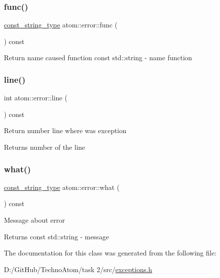 \subsubsection{\texorpdfstring{func()}{func()}}
{\footnotesize\ttfamily \hyperlink{classatom_1_1error_ac330e9fb7cedcf4a173c5eb156d7bdaf}{const\+\_\+string\+\_\+type} atom\+::error\+::func (\begin{DoxyParamCaption}{ }\end{DoxyParamCaption}) const\hspace{0.3cm}{\ttfamily [inline]}}

Return name caused function  const std\+::string -\/ name function \mbox{\label{classatom_1_1error_aa9443d1a458d0dc6086372444a58e8c6}} 
\subsubsection{\texorpdfstring{line()}{line()}}
{\footnotesize\ttfamily int atom\+::error\+::line (\begin{DoxyParamCaption}{ }\end{DoxyParamCaption}) const\hspace{0.3cm}{\ttfamily [inline]}}

Return number line where was exception \begin{DoxyReturn}{Returns}
number of the line 
\end{DoxyReturn}
\mbox{\label{classatom_1_1error_a126f6c573e37febac3148244389f7736}} 
\subsubsection{\texorpdfstring{what()}{what()}}
{\footnotesize\ttfamily \hyperlink{classatom_1_1error_ac330e9fb7cedcf4a173c5eb156d7bdaf}{const\+\_\+string\+\_\+type} atom\+::error\+::what (\begin{DoxyParamCaption}{ }\end{DoxyParamCaption}) const\hspace{0.3cm}{\ttfamily [inline]}}

Message about error \begin{DoxyReturn}{Returns}
const std\+::string -\/ message 
\end{DoxyReturn}


The documentation for this class was generated from the following file\+:\begin{DoxyCompactItemize}
\item 
D\+:/\+Git\+Hub/\+Techno\+Atom/task 2/src/\hyperlink{exceptions_8h}{exceptions.\+h}\end{DoxyCompactItemize}
